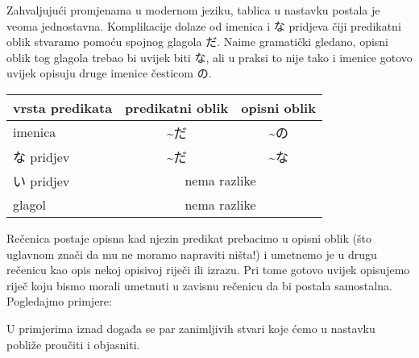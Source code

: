 	Zahvaljujući promjenama u modernom jeziku, tablica u nastavku postala je veoma jednostavna. Komplikacije dolaze od imenica i な pridjeva čiji predikatni oblik stvaramo pomoću spojnog glagola だ. Naime gramatički gledano, opisni oblik tog glagola trebao bi uvijek biti な, ali u praksi to nije tako i imenice gotovo uvijek opisuju druge imenice česticom の\footnotemark[4].
	
	
	\begin{table}[h]
		\centering
		\begin{tabular}{l c c}\toprule[2pt]
			vrsta predikata & predikatni oblik & opisni oblik\\
			\midrule
			imenica & \textasciitilde だ & \textasciitilde の\\
			な pridjev & \textasciitilde だ & \textasciitilde な\\
			い pridjev & \multicolumn{2}{c}{nema razlike}\\
			glagol & \multicolumn{2}{c}{nema razlike}\\
			\bottomrule[2pt]
		\end{tabular}
	\end{table}

	
	Rečenica postaje opisna kad njezin predikat prebacimo u opisni oblik (što uglavnom znači da mu ne moramo napraviti ništa!) i umetnemo je u drugu rečenicu kao opis nekoj opisivoj riječi ili izrazu. Pri tome gotovo uvijek opisujemo riječ koju bismo morali umetnuti u zavisnu rečenicu da bi postala samostalna. Pogledajmo primjere:
	
	\begin{reibun}
	\end{reibun}

	U primjerima iznad događa se par zanimljivih stvari koje ćemo u nastavku pobliže proučiti i objasniti.
	
